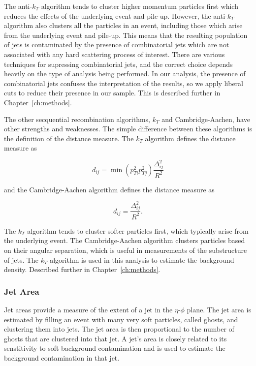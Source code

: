 The anti-$k_T$ algorithm tends to cluster higher momentum particles first which reduces the effects of the underlying event and pile-up. However, the anti-$k_T$ algorithm also clusters all the particles in an event, including those which arise from the underlying event and pile-up. This means that the resulting population of jets is contaminated by the presence of combinatorial jets which are not associated with any hard scattering process of interest. There are various techniques for supressing combinatorial jets, and the correct choice depends heavily on the type of analysis being performed. In our analysis, the presence of combinatorial jets confuses the interpretation of the results, so we apply liberal cuts to reduce their presence in our sample. This is described further in Chapter~\ref{ch:methods}. 

The other secquential recombination algorithms, $k_T$ and Cambridge-Aachen, have other strengths and weaknesses. The simple difference between these algorithms is the definition of the distance measure. The $k_T$ algorithm defines the distance measure as

\begin{equation}
d_{ij} = \min(p_{Ti}^{2} p_{Tj}^{2})\frac{\Delta_{ij}^2}{R^2}
\end{equation}

and the Cambridge-Aachen algorithm defines the distance measure as

\begin{equation}
d_{ij} = \frac{\Delta_{ij}^2}{R^2}.
\end{equation}

The $k_T$ algorithm tends to cluster softer particles first, which typically arise from the underlying event. The Cambridge-Aachen algorithm clusters particles based on their angular separation, which is useful in measurements of the substructure of jets. The $k_T$ algorithm is used in this analysis to estimate the background density. Described further in Chapter~\ref{ch:methods}.

\subsubsection*{Jet Area}
Jet areas provide a measure of the extent of a jet in the $\eta$-$\phi$ plane. The jet area is estimated by filling an event with many very soft particles, called ghosts, and clustering them into jets. The jet area is then proportional to the number of ghosts that are clustered into that jet. A jet's area is closely related to its senstitivity to soft background contamination and is used to estimate the background contamination in that jet. 

